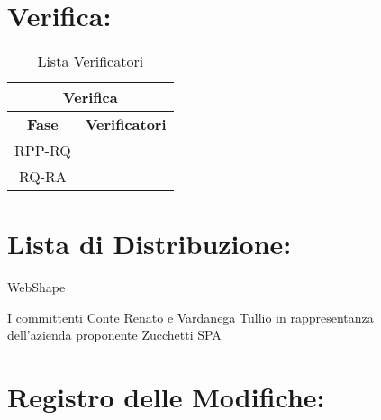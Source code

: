 	
\section*{\LARGE Verifica:}
\begin{table}[!h]
	\begin{center}
		\begin{tabular}
			{|c|c|}
			\hline
			\multicolumn{2}{|c|}{ \textbf{Verifica} } \\
			\hline
			\textbf{Fase} & \textbf{Verificatori} \\
			\hline
			\multirow{1}{*}{RPP-RQ} &  \\
									
			\hline
			\multirow{1}{*}{RQ-RA} & \\
									
			\hline
		\end{tabular}
		\caption{Lista Verificatori} %
		\label{tabverifica}
	\end{center}
\end{table}

\textbf{}
\newpage
\section*{\LARGE Lista di Distribuzione:}

	\begin{elenconumerato}{\normindent}
		\item WebShape 
		\item I committenti Conte Renato e Vardanega Tullio in rappresentanza \\  dell'azienda proponente Zucchetti SPA
	\end{elenconumerato}

\section*{\Large Registro delle Modifiche:}


